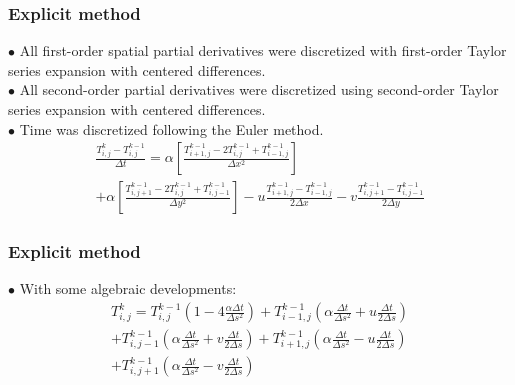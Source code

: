 \documentclass[xcolor=dvipsnames,10pt,aspectratio=169]{beamer}
\begin{document}
\begin{frame}
	\frametitle{Explicit method}

	$\bullet$ All first-order spatial partial derivatives were discretized with first-order Taylor series expansion with centered differences.\\
	$\bullet$ All second-order partial derivatives were discretized using second-order Taylor series expansion with centered differences.\\
	$\bullet$ Time was discretized following the Euler method.\\

	\begin{equation}
		\begin{split}
		\frac{T_{i,j}^{k} - T_{i , j}^{k-1} }{\Delta t}
		= \alpha \left[  \frac{T_{i+1,j}^{k-1} - 2 T_{i,j}^{k-1} + T_{i-1,j}^{k-1} }{\Delta x^2} \right]\\
		+\alpha \left[\frac{T_{i,j+1}^{k-1} - 2 T_{i,j}^{k-1} + T_{i,j-1}^{k-1}}{\Delta y^2}\right] - u \frac{T_{i+1,j}^{k-1} - T_{i-1,j}^{k-1}}{2 \Delta x} - v \frac{T_{i,j+1}^{k-1} - T_{i , j-1}^{k-1}}{2 \Delta y}
		\end{split}
	\end{equation}

\end{frame}





\begin{frame}
	\frametitle{Explicit method}
	$\bullet$ With some algebraic developments:
	\begin{equation}
		\begin{split}
		T_{i,j}^{k} = T_{i,j}^{k-1} \left( 1 - 4 \frac{\alpha \Delta t}{\Delta s ^2}\right) + T_{i -1, j}^{k-1} \left( \alpha \frac{\Delta t}{\Delta s^2} + u \frac{\Delta t}{2 \Delta s} \right)\\
		+ T_{i,j-1}^{k-1} \left( \alpha \frac{\Delta t}{\Delta s^2} + v \frac{\Delta t}{2 \Delta s} \right) +  T_{i+1,j}^{k-1} \left( \alpha \frac{\Delta t}{ \Delta s^2} - u \frac{\Delta t}{2 \Delta s}\right) \\
		+  T_{i,j+1}^{k-1} \left( \alpha \frac{\Delta t}{\Delta s^2} - v \frac{\Delta t}{2 \Delta s}\right)
		\end{split}
	\end{equation}
\end{frame}
\end{document}
